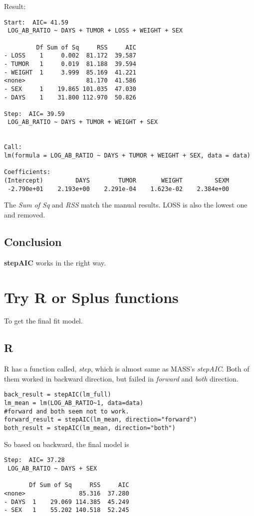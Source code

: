 \documentclass[a4paper,10pt]{article}
\begin{document}
Result:
\begin{verbatim}
Start:  AIC= 41.59
 LOG_AB_RATIO ~ DAYS + TUMOR + LOSS + WEIGHT + SEX

         Df Sum of Sq     RSS     AIC
- LOSS    1     0.002  81.172  39.587
- TUMOR   1     0.019  81.188  39.594
- WEIGHT  1     3.999  85.169  41.221
<none>                 81.170  41.586
- SEX     1    19.865 101.035  47.030
- DAYS    1    31.800 112.970  50.826

Step:  AIC= 39.59
 LOG_AB_RATIO ~ DAYS + TUMOR + WEIGHT + SEX


Call:
lm(formula = LOG_AB_RATIO ~ DAYS + TUMOR + WEIGHT + SEX, data = data)

Coefficients:
(Intercept)         DAYS        TUMOR       WEIGHT         SEXM
 -2.790e+01    2.193e+00    2.291e-04    1.623e-02    2.384e+00
\end{verbatim}
The \emph{Sum of Sq} and \emph{RSS} match the manual results. LOSS is also the lowest one and removed.

\subsection{Conclusion}
\textbf{stepAIC} works in the right way.

\section{Try R or Splus functions}
To get the final fit model.

\subsection{R}
R has a function called, \emph{step}, which is almost same as MASS's \emph{stepAIC}. Both of them worked in backward direction, but failed in \emph{forward} and \emph{both} direction.
\begin{verbatim}
back_result = stepAIC(lm_full)
lm_mean = lm(LOG_AB_RATIO~1, data=data)
#forward and both seem not to work.
forward_result = stepAIC(lm_mean, direction="forward")
both_result = stepAIC(lm_mean, direction="both")
\end{verbatim}

So based on backward, the final model is
\begin{verbatim}
Step:  AIC= 37.28
 LOG_AB_RATIO ~ DAYS + SEX

       Df Sum of Sq     RSS     AIC
<none>               85.316  37.280
- DAYS  1    29.069 114.385  45.249
- SEX   1    55.202 140.518  52.245
\end{verbatim}
\end{document}
